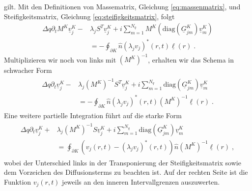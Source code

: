 gilt. Mit den Definitionen von Massematrix, Gleichung \eqref{eq:massenmatrix}, und Steifigkeitsmatrix, Gleichung \eqref{eq:steifigkeitsmatrix}, folgt
\begin{align*}
  \Delta q \partial_t M^K \underline{v}_j^K - &\lambda_j S^T\underline{v}_j^K + i\sum_{m=1}^{N_q} M^K \left(\text{diag}(\underline{G}_{jm}^K) \underline{v}_m^K\right) \\
  &= - \oint_{\partial K}  \hat{n} (\lambda_j v_j)^*(r,t)\underline{\ell}(r) \; .
\end{align*}
Multiplizieren wir noch von links mit $(M^K)^{-1}$, erhalten wir das Schema in schwacher Form
\begin{gather}
\begin{align}
  \Delta q \partial_t \underline{v}_j^K - &\lambda_j (M^K)^{-1}S^T\underline{v}_j^K + i\sum_{m=1}^{N_q} \text{diag}(\underline{G}_{jm}^K) \underline{v}_m^K \\
  &= - \oint_{\partial K}  \hat{n} (\lambda_j v_j)^*(r,t) (M^K)^{-1}\underline{\ell}(r) \; .
\end{align}
\end{gather}
Eine weitere partielle Integration führt auf die starke Form
\begin{gather}
\begin{align}
  \Delta q \partial_t \underline{v}_j^K + &\lambda_j (M^K)^{-1}S\underline{v}_j^K + i\sum_{m=1}^{N_q} \text{diag}(\underline{G}_{jm}^K) \underline{v}_m^K \\
  &=  \oint_{\partial K}  (v_j(r,t) - (\lambda_j v_j)^*(r,t)) \hat{n}  (M^K)^{-1}\underline{\ell}(r) \; ,
\end{align}
\end{gather}
wobei der Unterschied links in der Transponierung der Steifigkeitsmatrix sowie dem Vorzeichen des Diffusionsterms zu beachten ist. Auf der rechten Seite ist die Funktion $v_j(r,t)$ jeweils an den inneren Intervallgrenzen auszuwerten.

